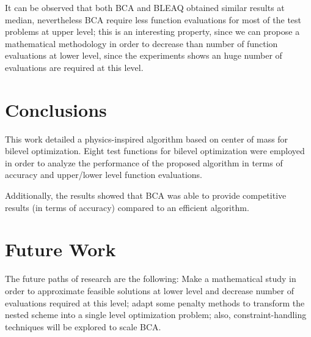 \documentclass[conference]{IEEEtran}
\begin{document}
It can be observed that both BCA and BLEAQ obtained similar results at median,
nevertheless BCA require less function evaluations for most of the test problems
at upper level; this is an interesting property, since we can propose a mathematical
methodology in order to decrease than number of function evaluations at lower level,
since the experiments shows an huge number of evaluations are required at this level.



\section{Conclusions}
\label{sec:conclu}

This work detailed a physics-inspired algorithm based on center of mass for bilevel
optimization. Eight test functions for bilevel optimization were employed in order
to analyze the performance of the proposed algorithm in terms of accuracy and
upper/lower level function evaluations.

Additionally, the results showed that BCA was able to provide competitive
results (in terms of accuracy) compared to an efficient algorithm.


\section{Future Work}
\label{sec:future}

The future paths of research are the following: Make a mathematical study  in
order to approximate feasible solutions at lower level and decrease number of
evaluations required at this level; adapt some penalty methods to transform the
nested scheme into a single level optimization problem; also, constraint-handling
techniques will be explored to scale BCA.












\end{document}
